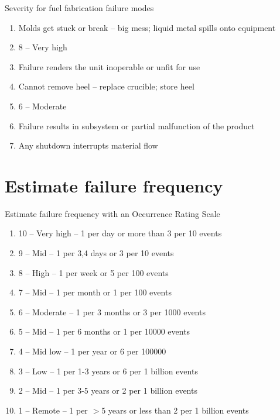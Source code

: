 \documentclass[aspectratio=1610,pdftex,dvipsnames,compress,xcolor={dvipsnames}]{beamer}
\begin{document}
\begin{frame}{Severity for fuel fabrication failure modes}
    \begin{enumerate}[series=outerlist,topsep=0pt,itemsep=3pt,leftmargin=*,label=(\arabic*)]
        \item[]Molds get stuck or break -- big mess; liquid metal spills onto equipment
        \item[]8 -- Very high 
        \item[]Failure renders the unit inoperable or unfit for use
            \vspace{0.10in}
        \item[]Cannot remove heel -- replace crucible; store heel
        \item[]6 -- Moderate
        \item[]Failure results in subsystem or partial malfunction of the product
            \vspace{0.10in}
        \item[]Any shutdown interrupts material flow
    \end{enumerate}
\end{frame}


\section{Estimate failure frequency}


\addtocounter{framenumber}{-1}
\begin{frame}{Estimate failure frequency with an Occurrence Rating Scale}
    \begin{enumerate}[series=outerlist,topsep=0pt,itemsep=3pt,leftmargin=*,label=(\arabic*)]
        \item[]10 -- Very high -- 1 per day or more than 3 per 10 events
        \item[]9 -- Mid -- 1 per 3,4 days or 3 per 10 events
        \item[]8 -- High -- 1 per week or 5 per 100 events
        \item[]7 -- Mid -- 1 per month or 1 per 100 events
        \item[]6 -- Moderate -- 1 per 3 months or 3 per 1000 events
        \item[]5 -- Mid -- 1 per 6 months or 1 per 10000 events
        \item[]4 -- Mid low -- 1 per year or 6 per 100000  
        \item[]3 -- Low -- 1 per 1-3 years or 6 per 1 billion events
        \item[]2 -- Mid -- 1 per 3-5 years or 2 per 1 billion events
        \item[]1 -- Remote -- 1 per $>$5 years or less than 2 per 1 billion events
    \end{enumerate}
\end{frame}
\end{document}
